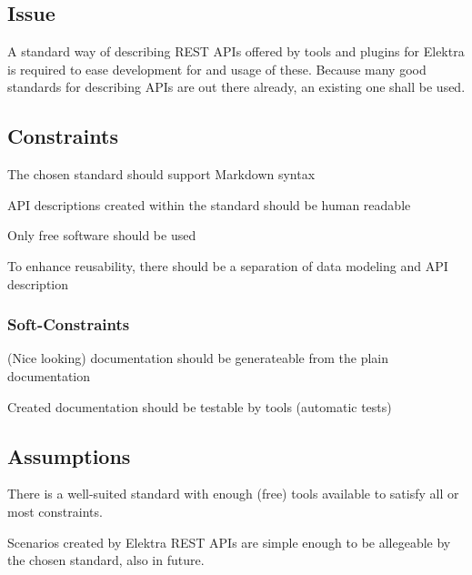 \subsection*{Issue}

A standard way of describing R\+E\+S\+T A\+P\+Is offered by tools and plugins for Elektra is required to ease development for and usage of these. Because many good standards for describing A\+P\+Is are out there already, an existing one shall be used.

\subsection*{Constraints}


\begin{DoxyItemize}
\item The chosen standard should support Markdown syntax
\item A\+P\+I descriptions created within the standard should be human readable
\item Only free software should be used
\item To enhance reusability, there should be a separation of data modeling and A\+P\+I description
\end{DoxyItemize}

\subsubsection*{Soft-\/\+Constraints}


\begin{DoxyItemize}
\item (Nice looking) documentation should be generateable from the plain documentation
\item Created documentation should be testable by tools (automatic tests)
\end{DoxyItemize}

\subsection*{Assumptions}


\begin{DoxyItemize}
\item There is a well-\/suited standard with enough (free) tools available to satisfy all or most constraints.
\item Scenarios created by Elektra R\+E\+S\+T A\+P\+Is are simple enough to be allegeable by the chosen standard, also in future.
\end{DoxyItemize}

